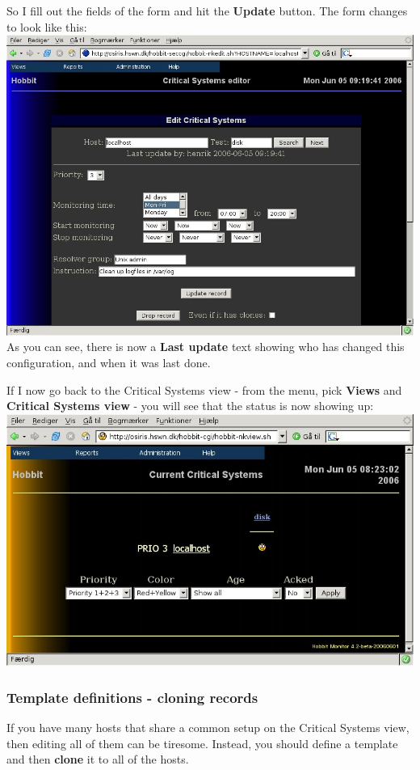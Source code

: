  So I fill out the fields of the form and hit the \textbf{Update}
 button. The form changes to look like this: \includegraphics[scale=1]{./editor-diskchanged.png}  As you can see, there is now a \textbf{Last update}
 text showing who has changed this configuration, and when it was last done.


 If I now go back to the Critical Systems view - from the menu, pick \textbf{Views}
 and \textbf{Critical Systems view}
 - you will see that the status is now showing up:\\ 
\includegraphics[scale=1]{./critview-disk.png} 
\subsubsection*{Template definitions - cloning records}


 If you have many hosts that share a common setup on the Critical Systems view, then editing all of them can be tiresome. Instead, you should define a template and then \textbf{clone}
 it to all of the hosts.


